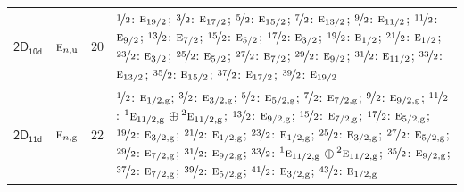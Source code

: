 \documentclass[10pt,a4paper]{article}
\numberwithin{equation}{section}
\newcommand{\grp}[1]{\mathsf{#1}}
\newcommand{\irr}[1]{\text{\normalfont\scshape #1}}
\newcommand{\conjpair}[1]{{}^{#1}}
\newcommand{\ptag}[1]{\mathrm{#1}}
\newlength{\fillwidth}\newlength{\cellwidth}\newlength{\colwidth}
\begin{document}
{\begin{longtable}{@{}llr>{\RaggedRight\arraybackslash}p{\fillwidth}@{}}
\href{2D10d.pdf}{$\grp{2D_{10d}}$} & $\irr{e}_{n,\ptag{u}}$ & 20 & $\nicefrac{1}{2}$: $\irr{e}_{19/2}$; $\nicefrac{3}{2}$: $\irr{e}_{17/2}$; $\nicefrac{5}{2}$: $\irr{e}_{15/2}$; $\nicefrac{7}{2}$: $\irr{e}_{13/2}$; $\nicefrac{9}{2}$: $\irr{e}_{11/2}$; $\nicefrac{11}{2}$: $\irr{e}_{9/2}$; $\nicefrac{13}{2}$: $\irr{e}_{7/2}$; $\nicefrac{15}{2}$: $\irr{e}_{5/2}$; $\nicefrac{17}{2}$: $\irr{e}_{3/2}$; $\nicefrac{19}{2}$: $\irr{e}_{1/2}$; $\nicefrac{21}{2}$: $\irr{e}_{1/2}$; $\nicefrac{23}{2}$: $\irr{e}_{3/2}$; $\nicefrac{25}{2}$: $\irr{e}_{5/2}$; $\nicefrac{27}{2}$: $\irr{e}_{7/2}$; $\nicefrac{29}{2}$: $\irr{e}_{9/2}$; $\nicefrac{31}{2}$: $\irr{e}_{11/2}$; $\nicefrac{33}{2}$: $\irr{e}_{13/2}$; $\nicefrac{35}{2}$: $\irr{e}_{15/2}$; $\nicefrac{37}{2}$: $\irr{e}_{17/2}$; $\nicefrac{39}{2}$: $\irr{e}_{19/2}$\\
\href{2D11d.pdf}{$\grp{2D_{11d}}$} & $\irr{e}_{n,\ptag{g}}$ & 22 & $\nicefrac{1}{2}$: $\irr{e}_{1/2,\ptag{g}}$; $\nicefrac{3}{2}$: $\irr{e}_{3/2,\ptag{g}}$; $\nicefrac{5}{2}$: $\irr{e}_{5/2,\ptag{g}}$; $\nicefrac{7}{2}$: $\irr{e}_{7/2,\ptag{g}}$; $\nicefrac{9}{2}$: $\irr{e}_{9/2,\ptag{g}}$; $\nicefrac{11}{2}$: $\conjpair{1}\irr{e}_{11/2,\ptag{g}}$${}\oplus{}$$\conjpair{2}\irr{e}_{11/2,\ptag{g}}$; $\nicefrac{13}{2}$: $\irr{e}_{9/2,\ptag{g}}$; $\nicefrac{15}{2}$: $\irr{e}_{7/2,\ptag{g}}$; $\nicefrac{17}{2}$: $\irr{e}_{5/2,\ptag{g}}$; $\nicefrac{19}{2}$: $\irr{e}_{3/2,\ptag{g}}$; $\nicefrac{21}{2}$: $\irr{e}_{1/2,\ptag{g}}$; $\nicefrac{23}{2}$: $\irr{e}_{1/2,\ptag{g}}$; $\nicefrac{25}{2}$: $\irr{e}_{3/2,\ptag{g}}$; $\nicefrac{27}{2}$: $\irr{e}_{5/2,\ptag{g}}$; $\nicefrac{29}{2}$: $\irr{e}_{7/2,\ptag{g}}$; $\nicefrac{31}{2}$: $\irr{e}_{9/2,\ptag{g}}$; $\nicefrac{33}{2}$: $\conjpair{1}\irr{e}_{11/2,\ptag{g}}$${}\oplus{}$$\conjpair{2}\irr{e}_{11/2,\ptag{g}}$; $\nicefrac{35}{2}$: $\irr{e}_{9/2,\ptag{g}}$; $\nicefrac{37}{2}$: $\irr{e}_{7/2,\ptag{g}}$; $\nicefrac{39}{2}$: $\irr{e}_{5/2,\ptag{g}}$; $\nicefrac{41}{2}$: $\irr{e}_{3/2,\ptag{g}}$; $\nicefrac{43}{2}$: $\irr{e}_{1/2,\ptag{g}}$\\

\end{longtable}}
\end{document}
